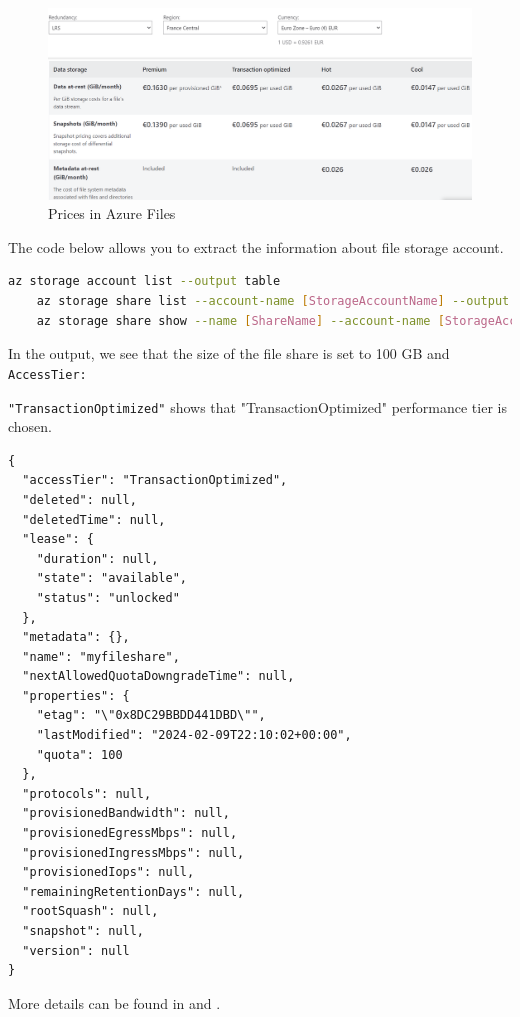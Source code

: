 \documentclass{article}
\begin{document}
\begin{figure}[H] 
\begin{center}
\includegraphics[scale = .45]{figures/price_storage.png}
\caption{Prices in Azure Files}
\label{fig:price_ss}
\end{center}
\end{figure}

The code below allows you to extract the information about file storage account.

    \begin{lstlisting}[language=bash]
    az storage account list --output table
    az storage share list --account-name [StorageAccountName] --output table
    az storage share show --name [ShareName] --account-name [StorageAccountName]
    \end{lstlisting}

In the output, we see that the size of the file share is set to 100 GB and \texttt{AccessTier:}

 \texttt{"TransactionOptimized"} shows that  "TransactionOptimized" performance tier is chosen.
    
    \begin{lstlisting}    
{
  "accessTier": "TransactionOptimized",
  "deleted": null,
  "deletedTime": null,
  "lease": {
    "duration": null,
    "state": "available",
    "status": "unlocked"
  },
  "metadata": {},
  "name": "myfileshare",
  "nextAllowedQuotaDowngradeTime": null,
  "properties": {
    "etag": "\"0x8DC29BBDD441DBD\"",
    "lastModified": "2024-02-09T22:10:02+00:00",
    "quota": 100
  },
  "protocols": null,
  "provisionedBandwidth": null,
  "provisionedEgressMbps": null,
  "provisionedIngressMbps": null,
  "provisionedIops": null,
  "remainingRetentionDays": null,
  "rootSquash": null,
  "snapshot": null,
  "version": null
}    
\end{lstlisting}

More details can be found in \cite{storageprice} and \cite{azurebills}.
\end{document}
